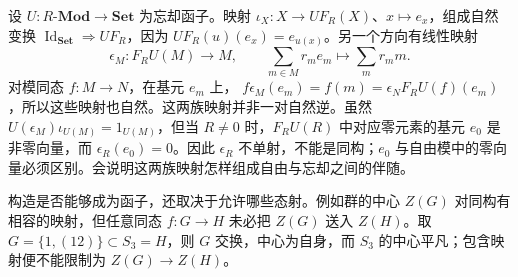 设 \(U:R\text{-}\mathbf{Mod}\rightarrow\mathbf{Set}\) 为忘却函子。映射 \(\iota_X:X\rightarrow U F_R(X)\)、\(x\mapsto e_x\)，组成自然变换 \(\operatorname{Id}_{\mathbf{Set}}\Rightarrow UF_R\)，因为 \(UF_R(u)(e_x)=e_{u(x)}\)。另一个方向有线性映射
\[
	\epsilon_M:F_RU(M)\longrightarrow M,\qquad \sum_{m\in M}r_me_m\longmapsto\sum_mr_mm.
\]
对模同态 \(f:M\rightarrow N\)，在基元 \(e_m\) 上， \(f\epsilon_M(e_m)=f(m)=\epsilon_NF_RU(f)(e_m)\)，所以这些映射也自然。这两族映射并非一对自然逆。虽然 \(U(\epsilon_M)\iota_{U(M)}=1_{U(M)}\)，但当 \(R\ne0\) 时，\(F_RU(R)\) 中对应零元素的基元 \(e_0\) 是非零向量，而 \(\epsilon_R(e_0)=0\)。因此 \(\epsilon_R\) 不单射，不能是同构；\(e_0\) 与自由模中的零向量必须区别。会说明这两族映射怎样组成自由与忘却之间的伴随。

\ProseParagraphBreak
构造是否能够成为函子，还取决于允许哪些态射。例如群的中心 \(Z(G)\) 对同构有相容的映射，但任意同态 \(f:G\rightarrow H\) 未必把 \(Z(G)\) 送入 \(Z(H)\)。取 \(G=\{1,(12)\}\subset S_3=H\)，则 \(G\) 交换，中心为自身，而 \(S_3\) 的中心平凡；包含映射便不能限制为 \(Z(G)\rightarrow Z(H)\)。

